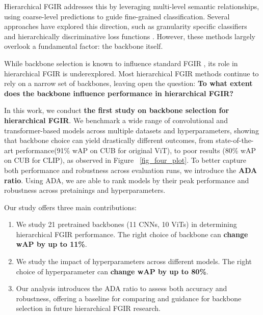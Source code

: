 \documentclass[sigconf, screen, review, anonymous]{acmart}
\begin{document}
Hierarchical FGIR addresses this by leveraging multi-level semantic relationships, using coarse-level predictions to guide fine-grained classification. Several approaches have explored this direction, such as granularity specific classifiers \cite{chang_your_2021} and hierarchically discriminative loss functions \cite{chen_fine-grained_2018}. However, these methods largely overlook a fundamental factor: the backbone itself. 

While backbone selection is known to influence standard FGIR \cite{ye_image_2024}, its role in hierarchical FGIR is underexplored. Most hierarchical FGIR methods continue to rely on a narrow set of backbones\cite{wang_multiple_2015, cerri_reduction_2016, chen_fine-grained_2018, chang_your_2021, chen_label_2022, chen_hierarchically_2024}, leaving open the question: \textbf{To what extent does the backbone influence performance in hierarchical FGIR?}

In this work, we conduct \textbf{the first study on backbone selection for hierarchical FGIR}. We benchmark a wide range of convolutional and transformer-based models across multiple datasets and hyperparameters, showing that backbone choice can yield drastically different outcomes, from state-of-the-art performance(91\% wAP on CUB for original ViT), to poor results (80\% wAP on CUB for CLIP), as observed in  Figure ~\ref{fig_four_plot}. To better capture both performance and robustness across evaluation runs, we introduce the \textbf{ADA ratio}. Using ADA, we are able to rank models by their peak performance and robustness across pretainings and hyperparameters.

Our study offers three main contributions: 
\begin{enumerate}
    \item We study 21 pretrained backbones (11 CNNs, 10 ViTs) in determining hierarchical FGIR performance. The right choice of backbone can \textbf{change wAP by up to 11\%}.
    \item We study the impact of hyperparameters across different models. The right choice of hyperparameter can \textbf{change wAP by up to 80\%}.
    \item Our analysis introduces the ADA ratio to assess both accuracy and robustness, offering a baseline for comparing and guidance for backbone selection in future hierarchical FGIR research.
\end{enumerate}
\end{document}
